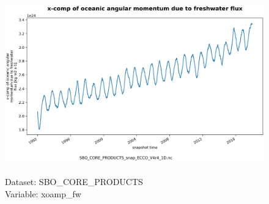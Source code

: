 \begin{figure}[H]
\centering
\includegraphics[scale=0.5]{../images/plots/oneD_plots/SBO_Core_Products/xoamp_fw.png}
\caption{\\Dataset: SBO\_CORE\_PRODUCTS\\Variable: xoamp\_fw}
\label{tab:table-SBO_CORE_PRODUCTS_xoamp_fw-Plot}
\end{figure}
\pagebreak
